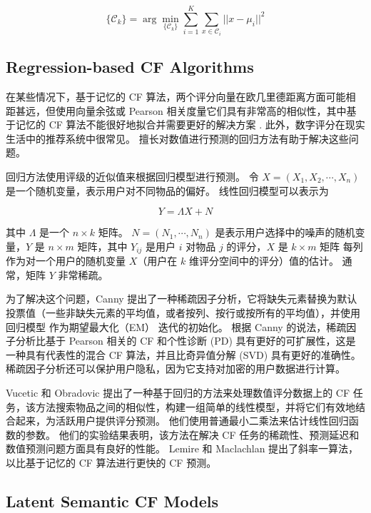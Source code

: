 \documentclass[sigconf]{acmart}
\begin{document}
\begin{equation}
  \{\mathcal{C}_k\}=\arg\min_{\{\mathcal{C}_k\}}\sum_{i=1}^K\sum_{x\in\mathcal{C}_i}\vert\vert x-\mu_i\vert\vert^2
\end{equation}

\subsection{Regression-based CF Algorithms}

在某些情况下，基于记忆的 CF 算法，两个评分向量在欧几里德距离方面可能相距甚远，但使用向量余弦或 Pearson 相关度量它们具有非常高的相似性，其中基于记忆的 CF 算法不能很好地拟合并需要更好的解决方案 . 此外，数字评分在现实生活中的推荐系统中很常见。 擅长对数值进行预测的回归方法有助于解决这些问题。

回归方法使用评级的近似值来根据回归模型进行预测。 令 $X = (X_1,X_2, \cdots ,X_n)$ 是一个随机变量，表示用户对不同物品的偏好。 线性回归模型可以表示为

\begin{equation}
  Y=\Lambda X+N
\end{equation}

其中 $\Lambda$ 是一个 $n \times k$ 矩阵。 $N = (N_1, \cdots , N_n)$ 是表示用户选择中的噪声的随机变量，$Y$ 是 $n \times m$ 矩阵，其中 $Y_{ij}$ 是用户 $i$ 对物品 $j$ 的评分，$X$ 是 $k \times m$ 矩阵 每列作为对一个用户的随机变量 $X$（用户在 $k$ 维评分空间中的评分）值的估计。 通常，矩阵 $Y$ 非常稀疏。

为了解决这个问题，Canny \cite{canny2002collaborative} 提出了一种稀疏因子分析，它将缺失元素替换为默认投票值（一些非缺失元素的平均值，或者按列、按行或按所有的平均值），并使用回归模型 作为期望最大化（EM）\cite{dempster1977maximum} 迭代的初始化。 根据 Canny 的说法，稀疏因子分析比基于 Pearson 相关的 CF 和个性诊断 (PD) 具有更好的可扩展性，这是一种具有代表性的混合 CF 算法，并且比奇异值分解 (SVD) \cite{billsus1998learning} 具有更好的准确性。 稀疏因子分析还可以保护用户隐私，因为它支持对加密的用户数据进行计算。

Vucetic 和 Obradovic \cite{vucetic2005collaborative} 提出了一种基于回归的方法来处理数值评分数据上的 CF 任务，该方法搜索物品之间的相似性，构建一组简单的线性模型，并将它们有效地结合起来，为活跃用户提供评分预测。 他们使用普通最小二乘法来估计线性回归函数的参数。 他们的实验结果表明，该方法在解决 CF 任务的稀疏性、预测延迟和数值预测问题方面具有良好的性能。 Lemire 和 Maclachlan \cite{lemire2005slope} 提出了斜率一算法，以比基于记忆的 CF 算法进行更快的 CF 预测。

\subsection{Latent Semantic CF Models}
\end{document}
